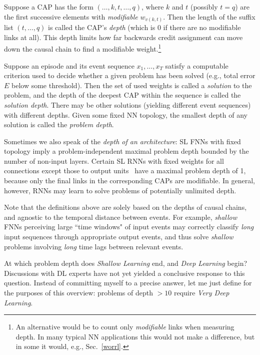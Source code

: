\documentclass[letterpaper]{article}
\begin{document}
\begin{CJK*}{UTF8}{gbsn}
Suppose a CAP has the form $(\ldots,k,t,\ldots,q)$, where
$k$ and $t$ (possibly $t=q$) are the first successive elements 
with {\em modifiable} $w_{v(k,t)}$. Then the 
length of the suffix list $(t,\ldots, q)$ is called the CAP's {\em depth}
(which is 0 if there are no modifiable links at all).
This depth limits how far backwards credit assignment 
can move down the causal chain 
to find a modifiable 
weight.\footnote{An alternative would be to count only {\em modifiable} links when measuring depth. In many 
typical NN applications this would not make a difference, but in some it would, e.g., Sec.~\ref{worrl}.}

Suppose an episode and its event sequence $x_1,\ldots,x_T$ satisfy a computable criterion 
used to decide whether a given problem has been solved 
(e.g., total error $E$ below some threshold). 
Then the set of used weights is called a {\em solution} to the problem, 
and the depth of the deepest CAP within the sequence is called the {\em solution depth}. 
There may be other solutions (yielding different event sequences) with different depths.
Given some fixed NN topology,
the  smallest depth of any solution is called the {\em problem depth}.



Sometimes we also speak of the {\em depth of an architecture}:
SL FNNs with fixed topology imply a problem-independent maximal problem depth bounded by
 the number of non-input layers.
Certain SL RNNs
with fixed weights for all 
connections except those to output units~\citep{Jaeger2001a,maass2002,Jaeger:04,schrauwen2007} 
have
a maximal problem depth of 1,
because only the final links in the corresponding CAPs are modifiable. 
In general, however, RNNs 
may learn to solve problems of potentially unlimited depth.

Note that the definitions above are 
solely based on the depths of causal chains, and
agnostic to the temporal distance between events.
For example, {\em shallow} FNNs perceiving large ``time windows" of input events may 
correctly classify {\em long} input sequences through appropriate output events, and thus 
solve {\em shallow}
problems involving {\em long} time lags between relevant events.

At which problem depth does {\em Shallow Learning} end, and {\em Deep Learning} begin?
Discussions with DL
experts have not yet yielded a conclusive response to this question. Instead of committing myself to a precise 
answer, let me just define for the purposes of this overview:
problems of depth $>10$ require 
{\em Very Deep Learning}.


\end{CJK*}
\end{document}
